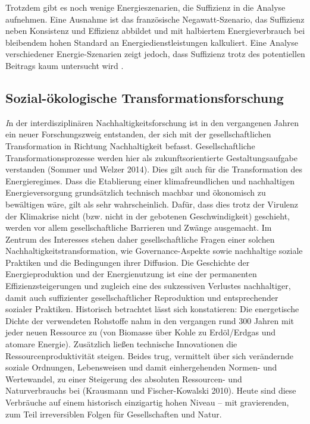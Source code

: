 \documentclass[a4paper,11pt,twoside]{scrartcl}
\begin{document}
Trotzdem gibt es noch wenige Energieszenarien, die Suffizienz in die Analyse aufnehmen. Eine Ausnahme ist das französische Negawatt-Szenario, das Suffizienz neben Konsistenz und Effizienz abbildet \cite{negawatt2017} und mit halbiertem Energieverbrauch bei bleibendem hohen Standard an Energiedienstleistungen kalkuliert. Eine Analyse verschiedener Energie-Szenarien zeigt jedoch, dass Suffizienz trotz des potentiellen Beitrags kaum untersucht wird \cite{SAMADI2017}.


\subsection*{Sozial-ökologische Transformationsforschung}
\textit In der interdisziplinären Nachhaltigkeitsforschung ist in den vergangenen Jahren ein neuer Forschungszweig entstanden, der sich mit der gesellschaftlichen Transformation in Richtung Nachhaltigkeit befasst. Gesellschaftliche Transformationsprozesse werden hier als zukunftsorientierte Gestaltungsaufgabe verstanden (Sommer und Welzer 2014). Dies gilt auch für die Transformation des Energieregimes. Dass die Etablierung einer klimafreundlichen und nachhaltigen Energieversorgung grundsätzlich technisch machbar und ökonomisch zu bewältigen wäre, gilt als sehr wahrscheinlich. Dafür, dass dies trotz der Virulenz der Klimakrise nicht (bzw. nicht in der gebotenen Geschwindigkeit) geschieht, werden vor allem gesellschaftliche Barrieren und Zwänge ausgemacht. Im Zentrum des Interesses stehen daher gesellschaftliche Fragen einer solchen Nachhaltigkeitstransformation, wie Governance-Aspekte sowie nachhaltige soziale Praktiken und die Bedingungen ihrer Diffusion.
Die Geschichte der Energieproduktion und der Energienutzung ist eine der permanenten Effizienzsteigerungen und zugleich eine des sukzessiven Verlustes nachhaltiger, damit auch suffizienter gesellschaftlicher Reproduktion und entsprechender sozialer Praktiken. Historisch betrachtet lässt sich konstatieren: Die energetische Dichte der verwendeten Rohstoffe nahm in den vergangen rund 300 Jahren mit jeder neuen Ressource zu (von Biomasse über Kohle zu Erdöl/Erdgas und atomare Energie). Zusätzlich ließen technische Innovationen die Ressourcenproduktivität steigen. Beides trug, vermittelt über sich verändernde soziale Ordnungen, Lebensweisen und damit einhergehenden Normen- und Wertewandel, zu einer Steigerung des absoluten Ressourcen- und Naturverbrauchs bei (Krausmann und Fischer-Kowalski 2010). Heute sind diese Verbräuche auf einem historisch einzigartig hohen Niveau – mit gravierenden, zum Teil irreversiblen Folgen für Gesellschaften und Natur.
\end{document}

